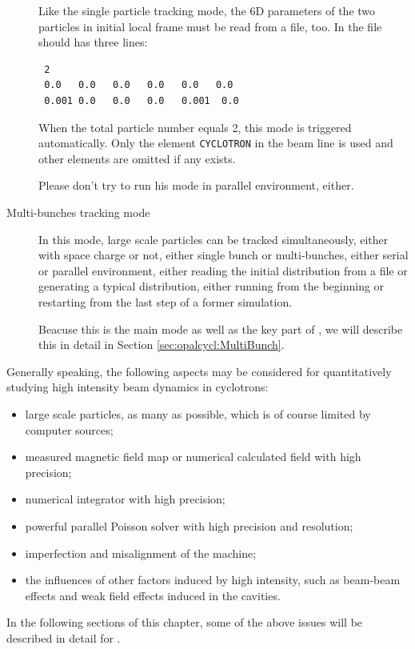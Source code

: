 \begin{description}
  Like the single particle tracking mode, 
  the 6D parameters of the two particles in initial local frame must be read from a file, too.
  In the file should has three lines:
\begin{verbatim}
 2
 0.0   0.0   0.0   0.0   0.0   0.0  
 0.001 0.0   0.0   0.0   0.001  0.0    
\end{verbatim}

When the total particle number equals 2, this mode is triggered automatically.
Only the element \texttt{CYCLOTRON} in the beam line is used and other elements are omitted if any exists.

Please don't try to run his mode in parallel environment, either.


\item[Multi-bunches tracking mode]

  In this mode, large scale particles can be tracked simultaneously, either with space charge or not, 
  either single bunch or multi-bunches, either serial or parallel environment, 
  either reading the initial distribution from a file or generating a typical distribution,  
  either running from the beginning or restarting from the last step of a former simulation.

  Beacuse this is the main mode as well as the key part of \opalcycl, 
  we will describe this in detail in Section \ref{sec:opalcycl:MultiBunch}.

\end{description}  
  
Generally speaking, the following aspects may be considered for quantitatively studying high intensity beam dynamics in cyclotrons:
  \begin{itemize}
  \item large scale particles, as many as possible, which is of course limited by computer sources;
  \item measured magnetic field map or numerical calculated field with high precision;
  \item numerical integrator with high precision;
  \item powerful parallel Poisson solver with high precision and resolution;
  \item imperfection and misalignment of the machine;
  \item the influences of other factors induced by high intensity, such as beam-beam effects and weak field effects induced in the cavities. 
  \end{itemize}
  In the following sections of this chapter, some of the above issues will be described in detail for \opalcycl.

